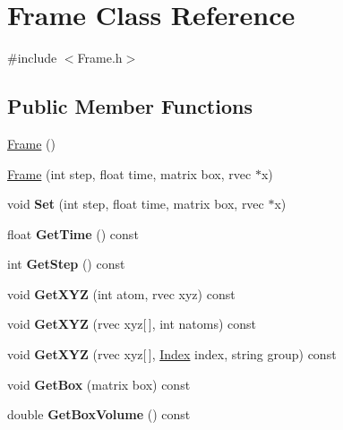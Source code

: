 \hypertarget{classFrame}{\section{Frame Class Reference}
\label{classFrame}
}


{\ttfamily \#include $<$Frame.\-h$>$}

\subsection*{Public Member Functions}
\begin{DoxyCompactItemize}
\item 
\hyperlink{classFrame_ad2e5946cf41d4817e750500acf05d02b}{Frame} ()
\item 
\hyperlink{classFrame_a0f3ba7abc832b6ca9d0401a9e5cfc4a0}{Frame} (int step, float time, matrix box, rvec $\ast$x)
\item 
\hypertarget{classFrame_affdb660765a1737e7c838c74e307d707}{void {\bfseries Set} (int step, float time, matrix box, rvec $\ast$x)}\label{classFrame_affdb660765a1737e7c838c74e307d707}

\item 
\hypertarget{classFrame_a9125c618fbb0791eab0576086cb562d6}{float {\bfseries Get\-Time} () const }\label{classFrame_a9125c618fbb0791eab0576086cb562d6}

\item 
\hypertarget{classFrame_a4b383d191c043db5ee263446a2ea7a71}{int {\bfseries Get\-Step} () const }\label{classFrame_a4b383d191c043db5ee263446a2ea7a71}

\item 
\hypertarget{classFrame_ad893a259ad39ca2ae393ebb2a3772e0b}{void {\bfseries Get\-X\-Y\-Z} (int atom, rvec xyz) const }\label{classFrame_ad893a259ad39ca2ae393ebb2a3772e0b}

\item 
\hypertarget{classFrame_a57fe1db79f90b9ac76403218575ce0c6}{void {\bfseries Get\-X\-Y\-Z} (rvec xyz\mbox{[}$\,$\mbox{]}, int natoms) const }\label{classFrame_a57fe1db79f90b9ac76403218575ce0c6}

\item 
\hypertarget{classFrame_a0ae40ed48c27658e81db14f76e60c0ad}{void {\bfseries Get\-X\-Y\-Z} (rvec xyz\mbox{[}$\,$\mbox{]}, \hyperlink{classIndex}{Index} index, string group) const }\label{classFrame_a0ae40ed48c27658e81db14f76e60c0ad}

\item 
\hypertarget{classFrame_a7b747f3795eb785eb9275f1c793c6695}{void {\bfseries Get\-Box} (matrix box) const }\label{classFrame_a7b747f3795eb785eb9275f1c793c6695}

\item 
\hypertarget{classFrame_a3676c3640f6047a77e5671f7171ba5f3}{double {\bfseries Get\-Box\-Volume} () const }\label{classFrame_a3676c3640f6047a77e5671f7171ba5f3}

\end{DoxyCompactItemize}


